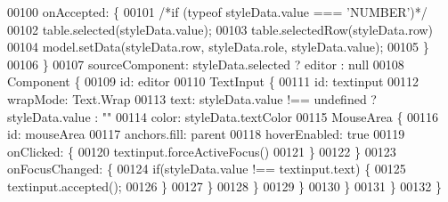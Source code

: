 \begin{DoxyCode}
00100                 onAccepted: \{
00101                     \textcolor{comment}{/*if (typeof styleData.value === 'NUMBER')*/}
00102                     table.selected(styleData.value);
00103                     table.selectedRow(styleData.row)
00104                     model.setData(styleData.row, styleData.role, styleData.value);
00105                 \}
00106             \}
00107             sourceComponent: styleData.selected ? editor : null
00108             Component \{
00109                 \textcolor{keywordtype}{id}: editor
00110                 TextInput \{
00111                     \textcolor{keywordtype}{id}: textinput
00112                     wrapMode: Text.Wrap
00113                     text: styleData.value !== undefined ? styleData.value : \textcolor{stringliteral}{""}
00114                     color: styleData.textColor
00115                     MouseArea \{
00116                         \textcolor{keywordtype}{id}: mouseArea
00117                         anchors.fill: parent
00118                         hoverEnabled: \textcolor{keyword}{true}
00119                         onClicked: \{
00120                             textinput.forceActiveFocus()
00121                         \}
00122                     \}
00123                     onFocusChanged: \{
00124                         \textcolor{keywordflow}{if}(styleData.value !== textinput.text) \{
00125                             textinput.accepted();
00126                         \}
00127                     \}
00128                 \}
00129             \}
00130         \}
00131     \}
00132 \}
\end{DoxyCode}
